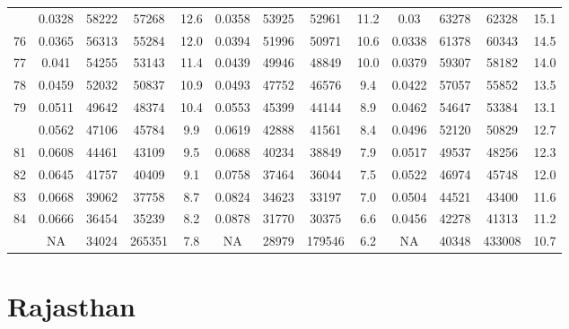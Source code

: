 \documentclass[
  14pt,
]{article}
\begin{document}
\begin{longtable}[t]{lcccccccccccc}
\addlinespace
75 & 0.0328 & 58222 & 57268 & 12.6 & 0.0358 & 53925 & 52961 & 11.2 & 0.03 & 63278 & 62328 & 15.1\\
76 & 0.0365 & 56313 & 55284 & 12.0 & 0.0394 & 51996 & 50971 & 10.6 & 0.0338 & 61378 & 60343 & 14.5\\
77 & 0.041 & 54255 & 53143 & 11.4 & 0.0439 & 49946 & 48849 & 10.0 & 0.0379 & 59307 & 58182 & 14.0\\
78 & 0.0459 & 52032 & 50837 & 10.9 & 0.0493 & 47752 & 46576 & 9.4 & 0.0422 & 57057 & 55852 & 13.5\\
79 & 0.0511 & 49642 & 48374 & 10.4 & 0.0553 & 45399 & 44144 & 8.9 & 0.0462 & 54647 & 53384 & 13.1\\
\addlinespace
80 & 0.0562 & 47106 & 45784 & 9.9 & 0.0619 & 42888 & 41561 & 8.4 & 0.0496 & 52120 & 50829 & 12.7\\
81 & 0.0608 & 44461 & 43109 & 9.5 & 0.0688 & 40234 & 38849 & 7.9 & 0.0517 & 49537 & 48256 & 12.3\\
82 & 0.0645 & 41757 & 40409 & 9.1 & 0.0758 & 37464 & 36044 & 7.5 & 0.0522 & 46974 & 45748 & 12.0\\
83 & 0.0668 & 39062 & 37758 & 8.7 & 0.0824 & 34623 & 33197 & 7.0 & 0.0504 & 44521 & 43400 & 11.6\\
84 & 0.0666 & 36454 & 35239 & 8.2 & 0.0878 & 31770 & 30375 & 6.6 & 0.0456 & 42278 & 41313 & 11.2\\
\addlinespace
85 & NA & 34024 & 265351 & 7.8 & NA & 28979 & 179546 & 6.2 & NA & 40348 & 433008 & 10.7\\*
\end{longtable}

\pagebreak

\hypertarget{rajasthan}{%
\section{Rajasthan}\label{rajasthan}}
\end{document}
